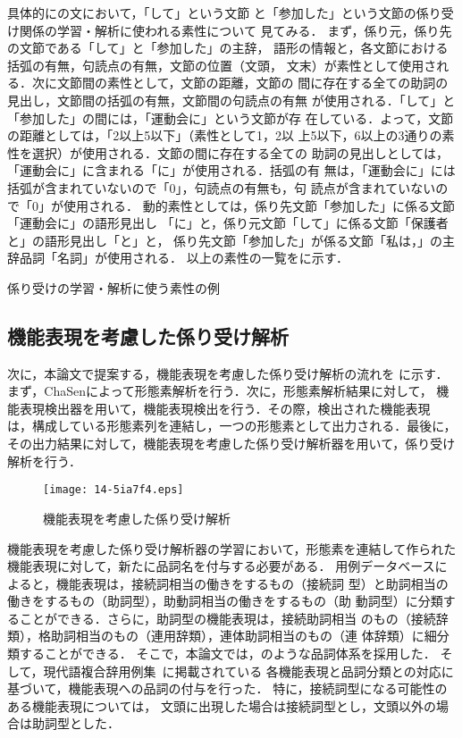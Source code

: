 \documentclass[japanese]{jnlp_1.3e}
\begin{document}
具体的にの文において，「して」という文節
と「参加した」という文節の係り受け関係の学習・解析に使われる素性について
見てみる．
まず，係り元，係り先の文節である「して」と「参加した」の主辞，
語形の情報と，各文節における括弧の有無，句読点の有無，文節の位置（文頭，
文末）が素性として使用される．次に文節間の素性として，文節の距離，文節の
間に存在する全ての助詞の見出し，文節間の括弧の有無，文節間の句読点の有無
が使用される．「して」と「参加した」の間には，「運動会に」という文節が存
在している．よって，文節の距離としては，「2以上5以下」（素性として1，2以
上5以下，6以上の3通りの素性を選択）が使用される．文節の間に存在する全ての
助詞の見出しとしては，「運動会に」に含まれる「に」が使用される．括弧の有
無は，「運動会に」には括弧が含まれていないので「0」，句読点の有無も，句
読点が含まれていないので「0」が使用される．
動的素性としては，係り先文節「参加した」に係る文節「運動会に」の語形見出し
「に」と，係り元文節「して」に係る文節「保護者と」の語形見出し「と」と，
係り先文節「参加した」が係る文節「私は，」の主辞品詞「名詞」が使用される．
以上の素性の一覧をに示す．

\begin{table}[b]
  \caption{係り受けの学習・解析に使う素性の例}
  \label{tbl:feature_for_cabocha}

\end{table}


\subsection{機能表現を考慮した係り受け解析}
\label{subsec:機能表現を考慮した学習}

次に，本論文で提案する，機能表現を考慮した係り受け解析の流れを
に示す．
まず，ChaSenによって形態素解析を行う．次に，形態素解析結果に対して，
機能表現検出器を用いて，機能表現検出を行う．その際，検出された機能表現
は，構成している形態素列を連結し，一つの形態素として出力される．最後に，
その出力結果に対して，機能表現を考慮した係り受け解析器を用いて，係り受け
解析を行う．

\begin{figure}[b]
\begin{center}
\texttt{[image: 14-5ia7f4.eps]}
\end{center}
 \caption{機能表現を考慮した係り受け解析}
 \label{fig:flow1}
\end{figure}


機能表現を考慮した係り受け解析器の学習において，形態素を連結して作られた
機能表現に対して，新たに品詞名を付与する必要がある．
用例データベースによると，機能表現は，接続詞相当の働きをするもの（接続詞
型）と助詞相当の働きをするもの（助詞型），助動詞相当の働きをするもの（助
動詞型）に分類することができる．さらに，助詞型の機能表現は，接続助詞相当
のもの（接続辞類），格助詞相当のもの（連用辞類），連体助詞相当のもの（連
体辞類）に細分類することができる．
そこで，本論文では，のような品詞体系を採用した．
そして，現代語複合辞用例集~\cite{NLRI01aj-nlp}に掲載されている
各機能表現と品詞分類との対応に基づいて，機能表現への品詞の付与を行った．
特に，接続詞型になる可能性のある機能表現については，
文頭に出現した場合は接続詞型とし，文頭以外の場合は助詞型とした．
\end{document}
